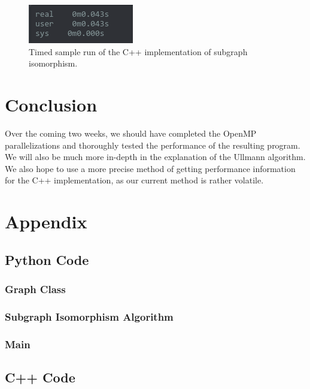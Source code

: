\documentclass{article}
\begin{document}
  \begin{figure}[H]
    \centering
    \includegraphics[scale=0.6]{images/cperf}
    \caption{Timed sample run of the C++ implementation of subgraph isomorphism.}
  \end{figure}

\section{Conclusion}
  Over the coming two weeks, we should have completed the OpenMP parallelizations and thoroughly tested the performance of the resulting program. We will also be much more in-depth in the explanation of the Ullmann algorithm. We also hope to use a more precise method of getting performance information for the C++ implementation, as our current method is rather volatile.

\section{Appendix}
  \subsection{Python Code}
    \subsubsection{Graph Class}
      
    \subsubsection{Subgraph Isomorphism Algorithm}
      
    \subsubsection{Main}
      

  \subsection{C++ Code}
\end{document}
